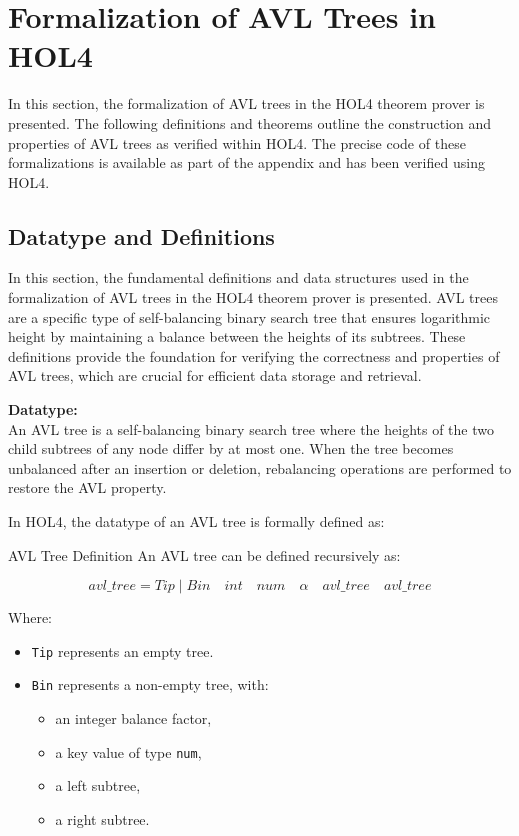 \chapter{Formalization of AVL Trees in HOL4}\label{chap:relatedWork}

In this section, the formalization of AVL trees in the HOL4 theorem prover is presented. The following definitions and theorems outline the construction and properties of AVL trees as verified within HOL4. The precise code of these formalizations is available as part of the appendix and has been verified using HOL4.

\section{Datatype and Definitions}

In this section, the fundamental definitions and data structures used in the formalization of AVL trees in the HOL4 theorem prover is presented. AVL trees are a specific type of self-balancing binary search tree that ensures logarithmic height by maintaining a balance between the heights of its subtrees. These definitions provide the foundation for verifying the correctness and properties of AVL trees, which are crucial for efficient data storage and retrieval.

\textbf{Datatype:} \\
An AVL tree is a self-balancing binary search tree where the heights of the two child subtrees of any node differ by at most one. When the tree becomes unbalanced after an insertion or deletion, rebalancing operations are performed to restore the AVL property.

In HOL4, the datatype of an AVL tree is formally defined as:

\begin{defn}{AVL Tree Definition}
An AVL tree can be defined recursively as:

\[
    avl\_tree = Tip \mid Bin \quad \mathit{int} \quad \mathit{num} \quad \alpha \quad avl\_tree \quad avl\_tree
\]

Where:
\begin{itemize}
    \item \texttt{Tip} represents an empty tree.
    \item \texttt{Bin} represents a non-empty tree, with:
    \begin{itemize}
        \item an integer balance factor,
        \item a key value of type \texttt{num},
        \item a left subtree,
        \item a right subtree.
    \end{itemize}
\end{itemize}
\end{defn}

